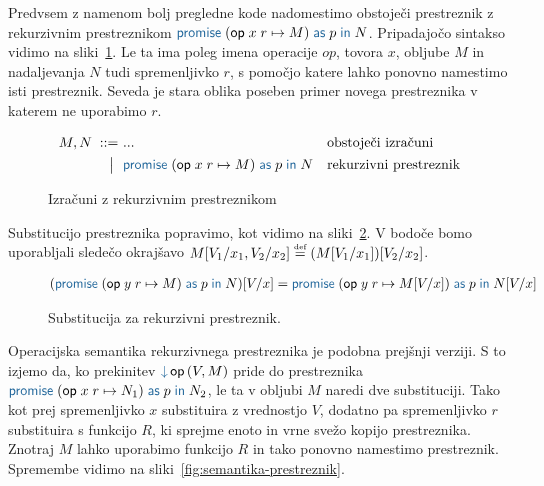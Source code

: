 Predvsem z namenom bolj pregledne kode nadomestimo obstoječi prestreznik z rekurzivnim prestreznikom $\tmwithrec{op}{x}{r}{M}{p}{N}$. Pripadajočo sintakso vidimo na sliki~\ref{fig:izrazi-prestreznik}. Le ta ima poleg imena operacije $op$, tovora $x$, obljube $M$ in nadaljevanja $N$ tudi spremenljivko $r$, s pomočjo katere lahko ponovno namestimo isti prestreznik.  Seveda je stara oblika poseben primer novega prestreznika v katerem ne uporabimo $r$.


\begin{figure}[H]
	\centering
	\small
	\begin{align*}
		M, N
		\bnfis& ...                            & &\text{obstoječi izračuni} \\
		\bnfor& \tmwithrec{op}{x}{r}{M}{p}{N}  & &\text{rekurzivni prestreznik}
	\end{align*}
	
	\caption{Izračuni z rekurzivnim prestreznikom}
	\label{fig:izrazi-prestreznik}
\end{figure}

Substitucijo prestreznika popravimo, kot vidimo na sliki~\ref{fig:substitucija-prestreznik}. V bodoče bomo uporabljali sledečo okrajšavo $M[V_1/x_1, V_2/x_2] \mathrel{\overset{\text{\tiny def}}{=}} (M[V_1/x_1])[V_2/x_2]$.

\begin{figure}[H]
	\centering
	\small
	\begin{align*}
		(\tmwithrec{op}{y}{r}{M}{p}{N})[V/x] &= \tmwithrec{op}{y}{r}{M[V/x]}{p}{N[V/x]}
	\end{align*}
	\vspace{-5ex}
	\caption{Substitucija za rekurzivni prestreznik.}
	\label{fig:substitucija-prestreznik}
\end{figure}

Operacijska semantika rekurzivnega prestreznika je podobna prejšnji verziji. S to izjemo da, ko prekinitev $\tmopin{op}{V}{M}$ pride do prestreznika $\tmwithrec{op}{x}{r}{N_1}{p}{N_2}$, le ta v obljubi $M$ naredi dve substituciji. Tako kot prej spremenljivko $x$ substituira z vrednostjo $V$, dodatno pa spremenljivko $r$ substituira s funkcijo $R$, ki sprejme enoto in vrne svežo kopijo prestreznika. Znotraj $M$ lahko uporabimo funkcijo $R$ in tako ponovno namestimo prestreznik. Spremembe vidimo na sliki~\ref{fig:semantika-prestreznik}.

